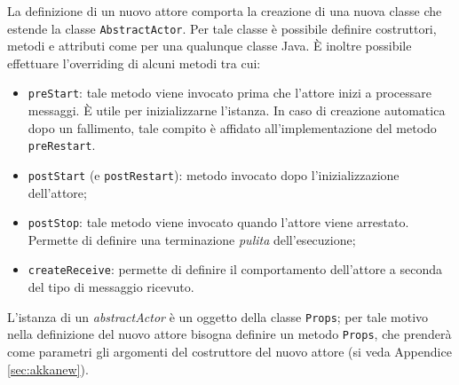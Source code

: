 La definizione di un nuovo attore comporta la creazione di una nuova classe
che estende la classe \texttt{AbstractActor}.
Per tale classe è possibile definire costruttori, metodi e attributi come per una
qualunque classe Java. \`E inoltre possibile  effettuare l'overriding di alcuni metodi 
tra cui:
\begin{itemize}
	\item \texttt{preStart}: tale metodo viene invocato prima che l'attore inizi
	  a processare messaggi. \`E utile per inizializzarne l'istanza.
          In caso di creazione automatica dopo un fallimento, tale compito è affidato
          all'implementazione del metodo \texttt{preRestart}.
	\item \texttt{postStart} (e \texttt{postRestart}):
          metodo invocato dopo l'inizializzazione dell'attore;
	\item \texttt{postStop}: tale metodo viene invocato quando l'attore viene arrestato.
	Permette di definire una terminazione \emph{pulita} dell'esecuzione;
	\item \texttt{createReceive}: permette di definire il comportamento dell'attore
	a seconda del tipo di messaggio ricevuto.
\end{itemize}
L'istanza di un \emph{abstractActor} è un oggetto della classe \texttt{Props}; per tale motivo
nella definizione del nuovo attore bisogna definire un metodo \texttt{Props}, che prenderà
come parametri gli argomenti del costruttore del nuovo attore (si veda Appendice \ref{sec:akkanew}).
